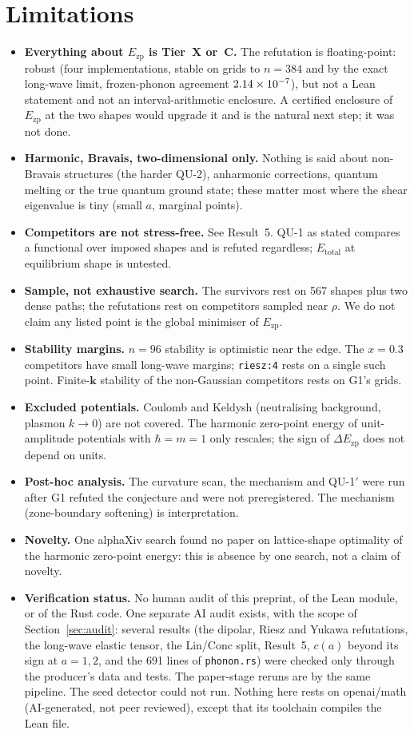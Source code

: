 \documentclass[10pt]{article}
\newcommand{\Ezp}{E_{\mathrm{zp}}}
\begin{document}
\section{Limitations}\label{sec:lim}
\begin{itemize}\itemsep=1pt
\item \textbf{Everything about $\Ezp$ is Tier~X or~C.} The refutation is floating-point: robust (four implementations, stable on grids to $n=384$ and by the exact long-wave limit, frozen-phonon agreement $2.14\times10^{-7}$), but not a Lean statement and not an interval-arithmetic enclosure. A certified enclosure of $\Ezp$ at the two shapes would upgrade it and is the natural next step; it was not done.
\item \textbf{Harmonic, Bravais, two-dimensional only.} Nothing is said about non-Bravais structures (the harder QU-2), anharmonic corrections, quantum melting or the true quantum ground state; these matter most where the shear eigenvalue is tiny (small $a$, marginal points).
\item \textbf{Competitors are not stress-free.} See Result~5. QU-1 as stated compares a functional over imposed shapes and is refuted regardless; $E_{\mathrm{total}}$ at equilibrium shape is untested.
\item \textbf{Sample, not exhaustive search.} The survivors rest on 567 shapes plus two dense paths; the refutations rest on competitors sampled near $\rho$. We do not claim any listed point is the global minimiser of $\Ezp$.
\item \textbf{Stability margins.} $n=96$ stability is optimistic near the edge. The $x=0.3$ competitors have small long-wave margins; \texttt{riesz:4} rests on a single such point. Finite-$\mathbf k$ stability of the non-Gaussian competitors rests on G1's grids.
\item \textbf{Excluded potentials.} Coulomb and Keldysh (neutralising background, plasmon $k\to0$) are not covered. The harmonic zero-point energy of unit-amplitude potentials with $\hbar=m=1$ only rescales; the sign of $\Delta\Ezp$ does not depend on units.
\item \textbf{Post-hoc analysis.} The curvature scan, the mechanism and QU-1$'$ were run after G1 refuted the conjecture and were not preregistered. The mechanism (zone-boundary softening) is interpretation.
\item \textbf{Novelty.} One alphaXiv search found no paper on lattice-shape optimality of the harmonic zero-point energy: this is absence by one search, not a claim of novelty.
\item \textbf{Verification status.} No human audit of this preprint, of the Lean module, or of the Rust code. One separate AI audit exists, with the scope of Section~\ref{sec:audit}: several results (the dipolar, Riesz and Yukawa refutations, the long-wave elastic tensor, the Lin/Conc split, Result~5, $c(a)$ beyond its sign at $a=1,2$, and the 691 lines of \texttt{phonon.rs}) were checked only through the producer's data and tests. The paper-stage reruns are by the same pipeline. The seed detector could not run. Nothing here rests on openai/math (AI-generated, not peer reviewed), except that its toolchain compiles the Lean file.

\end{itemize}
\end{document}
